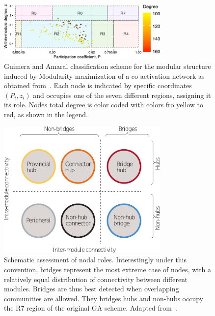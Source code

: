 \begin{figure}[htb!]
\centering
\includegraphics[width=0.75\textwidth]{images/guimera_amaral_coact_q.pdf}
\caption{Guimera and Amaral classification scheme for the modular structure induced by Modularity maximization of a co-activation network as obtained from~\cite{crossley2013a}. Each node is indicated by specific coordinates $(P_i,z_i)$ and occupies one of the seven different regions, assigning it its role. Nodes total degree is color coded with colors fro yellow to red, as shown in the legend.}
\label{fig:gagraph}
\end{figure}

\begin{figure}[htb!]
\centering
\includegraphics[width=0.75\textwidth]{images/hubs_nonhubs.pdf}
\caption{Schematic assessment of nodal roles. Interestingly under this convention, bridges represent the most extreme case of nodes, with a relatively equal distribution of connectivity between different modules. Bridges are thus best detected when overlapping communities are allowed. They bridges hubs and non-hubs occupy the R7 region of the original GA scheme. Adapted from~\cite{fornito2015}.}
\label{fig:hubs_bridges}
\end{figure}

